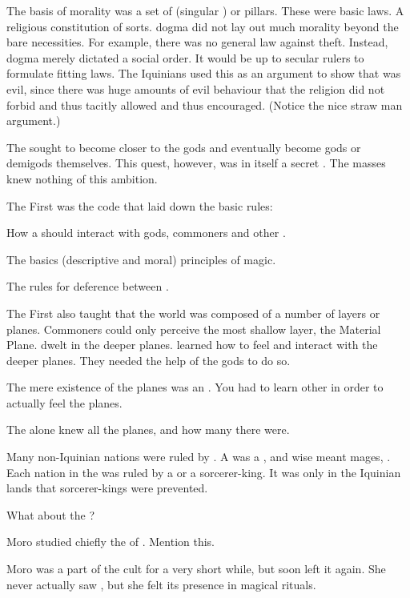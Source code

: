   The basis of \Ortaican morality was a set of \leges (singular \lex) or pillars. 
  These were basic laws. 
  A religious constitution of sorts.
  \Ortaican dogma did not lay out much morality beyond the bare necessities.
  For example, there was no general law against theft.
  Instead, \Ortaican dogma merely dictated a social order.
  It would be up to secular rulers to formulate fitting laws.
  The Iquinians used this as an argument to show that \Ortaicanism was evil, since there was huge amounts of evil behaviour that the religion did not forbid and thus tacitly allowed and thus encouraged.
  (Notice the nice straw man argument.)
  
  The \rethyaxes sought to become closer to the gods and eventually become gods or demigods themselves.
  This quest, however, was in itself a secret \arcanum.
  The masses knew nothing of this ambition.
  
  The First \Arcanum was the \rethyax code that laid down the basic rules:
    \item How a \rethyax should interact with gods, commoners and other \rethyaxes.
    \item The basics (descriptive and moral) principles of magic.
    \item The rules for deference between \rethyaxes. 
    \item 
      The First \Arcanum also taught that the world was composed of a number of layers or planes. 
      Commoners could only perceive the most shallow layer, the Material Plane. 
      \Daimonia dwelt in the deeper planes. 
      \Rethyaxes learned how to feel and interact with the deeper planes. 
      They needed the help of the gods to do so. 
      
      The mere existence of the planes was an \arcanum.
      You had to learn other \arcana in order to actually feel the planes. 
      
      The \Primordials alone knew all the planes, and how many there were. 


Many non-Iquinian nations were ruled by \rethyaxes.
A \baccon was a , and wise meant mages, \rethyaxes.
Each nation in the \Serplands was ruled by a \rethyax \baccon or a sorcerer-king. 
It was only in the Iquinian lands that sorcerer-kings were prevented. 

What about the \Shurco?


Moro \Cornel studied chiefly the \arcanum of \Nasshikerr. 
Mention this. 


Moro was a part of the \Ubloth cult for a very short while, but soon left it again.
She never actually saw \Ubloth, but she felt its presence in magical rituals. 

